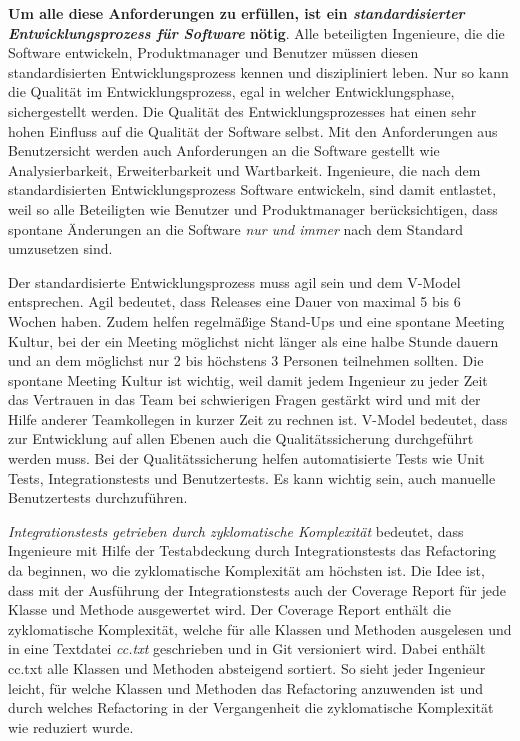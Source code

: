 \documentclass{scrarticle}
\numberwithin{equation}{section}
\begin{document}
\textbf{Um alle diese Anforderungen zu erfüllen, ist ein \textit{standardisierter Entwicklungsprozess für Software} nötig}. Alle beteiligten Ingenieure, die die Software entwickeln, Produktmanager und Benutzer müssen diesen standardisierten Entwicklungsprozess kennen und diszipliniert leben. Nur so kann die Qualität im Entwicklungsprozess, egal in welcher Entwicklungsphase, sichergestellt werden. Die Qualität des Entwicklungsprozesses hat einen sehr hohen Einfluss auf die Qualität der Software selbst. Mit den Anforderungen aus Benutzersicht werden auch Anforderungen an die Software gestellt wie Analysierbarkeit, Erweiterbarkeit und Wartbarkeit. Ingenieure, die nach dem standardisierten Entwicklungsprozess Software entwickeln, sind damit entlastet, weil so alle Beteiligten wie Benutzer und Produktmanager berücksichtigen, dass spontane Änderungen an die Software \textit{nur und immer} nach dem Standard umzusetzen sind.

Der standardisierte Entwicklungsprozess muss agil sein und dem V-Model entsprechen. Agil bedeutet, dass Releases eine Dauer von maximal 5 bis 6 Wochen haben. Zudem helfen regelmäßige Stand-Ups und eine spontane Meeting Kultur, bei der ein Meeting möglichst nicht länger als eine halbe Stunde dauern und an dem möglichst nur 2 bis höchstens 3 Personen teilnehmen sollten. Die spontane Meeting Kultur ist wichtig, weil damit jedem Ingenieur zu jeder Zeit das Vertrauen in das Team bei schwierigen Fragen gestärkt wird und mit der Hilfe anderer Teamkollegen in kurzer Zeit zu rechnen ist. V-Model bedeutet, dass zur Entwicklung auf allen Ebenen auch die Qualitätssicherung durchgeführt werden muss. Bei der Qualitätssicherung helfen automatisierte Tests wie Unit Tests, Integrationstests und Benutzertests. Es kann wichtig sein, auch manuelle Benutzertests durchzuführen.

\textit{Integrationstests getrieben durch zyklomatische Komplexität} bedeutet, dass Ingenieure mit Hilfe der Testabdeckung durch Integrationstests das Refactoring da beginnen, wo die zyklomatische Komplexität am höchsten ist. Die Idee ist, dass mit der Ausführung der Integrationstests auch der Coverage Report für jede Klasse und Methode ausgewertet wird. Der Coverage Report enthält die zyklomatische Komplexität, welche für alle Klassen und Methoden ausgelesen und in eine Textdatei \textit{cc.txt} geschrieben und in Git versioniert wird. Dabei enthält cc.txt alle Klassen und Methoden absteigend sortiert. So sieht jeder Ingenieur leicht, für welche Klassen und Methoden das Refactoring anzuwenden ist und durch welches Refactoring in der Vergangenheit die zyklomatische Komplexität wie reduziert wurde.
\end{document}
